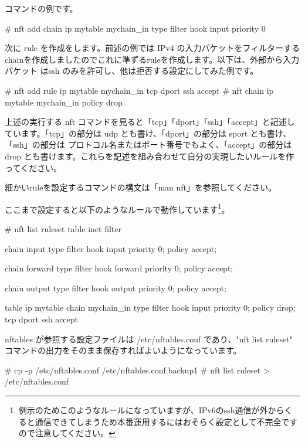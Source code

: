\documentclass[mingoth,a4paper]{jsarticle}
\begin{document}
コマンドの例です。

\begin{commandline}
# nft add chain ip mytable mychain_in { type filter hook input priority 0 \; }
\end{commandline}



次に rule を作成をします。前述の例では IPv4 の入力パケットをフィルターするchainを作成しましたのでこれに準ずるruleを作成します。以下は、外部から入力パケット はssh のみを許可し、他は拒否する設定にしてみた例です。

\begin{commandline}
# nft add rule ip mytable mychain_in tcp dport ssh accept
# nft chain ip mytable mychain_in { policy drop \; }
\end{commandline}

上述の実行する nft コマンドを見ると「tcp」「dport」「ssh」「accept」と記述しています。「tcp」の部分は udp とも書け、「dport」の部分は sport とも書け、「ssh」の部分は プロトコル名またはポート番号でもよく、「accept」の部分は drop とも書けます。これらを記述を組み合わせて自分の実現したいルールを作ってください。

細かいruleを設定するコマンドの構文は「man nft」を参照してください。



ここまで設定すると以下のようなルールで動作しています\footnote{例示のためこのようなルールになっていますが、IPv6のssh通信が外からくると通信できてしまうため本番運用するにはおそらく設定として不完全ですので注意してください。}。

\begin{commandline}
# nft list ruleset
table inet filter {
    chain input {
        type filter hook input priority 0; policy accept;
    }

    chain forward {
        type filter hook forward priority 0; policy accept;
    }

    chain output {
        type filter hook output priority 0; policy accept;
    }
}
table ip mytable {
    chain mychain_in {
        type filter hook input priority 0; policy drop;
        tcp dport ssh accept
    }
}
\end{commandline}

nftables が参照する設定ファイルは /etc/nftables.conf であり、"nft list ruleset" コマンドの出力をそのまま保存すればよいようになっています。

\begin{commandline}
# cp -p /etc/nftables.conf /etc/nftables.conf.backup1
# nft list ruleset > /etc/nftables.conf  
\end{commandline}
\end{document}
